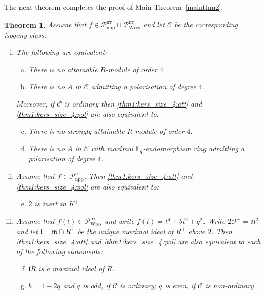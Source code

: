 \documentclass[11pt]{amsart}
\newcommand\Fq{\mathbb{F}_q}
\newcommand\cC{\mathcal{C}}
\newcommand\cO{\mathcal{O}}
\newcommand\frl{\mathfrak{l}}
\newcommand\frm{\mathfrak{m}}
\theoremstyle{plain}
\newtheorem{theorem}{Theorem}[section]
\theoremstyle{definition}
\newcommand\PirrA{\mathcal{P}^\mathrm{irr}_\mathrm{npp}}
\newcommand\PirrB{\mathcal{P}^\mathrm{irr}_\mathrm{Wres}}
\begin{document}
The next theorem completes the proof of Main Theorem~\ref{mainthm2}.
\begin{theorem}\label{thm:kers_size_4}
    Assume that $f\in\PirrA\sqcup\PirrB$ and let $\cC$ be the corresponding isogeny class.
    \begin{enumerate}[(i)]
        \item \label{thm1:kers_size_4}            
            The following are equivalent:
            \begin{enumerate}[(a)]
                \item \label{thm1:kers_size_4:att} There is no attainable $R$-module of order $4$.
                \item \label{thm1:kers_size_4:pol} There is no $A$ in $\cC$ admitting a polarisation of degree $4$.
            \end{enumerate}
            Moreover, if $\cC$ is ordinary then \ref{thm1:kers_size_4:att} and \ref{thm1:kers_size_4:pol} are also equivalent to:
            \begin{enumerate}[(a)]
                \setcounter{enumii}{2}
                \item \label{thm1:kers_size_4:str_att} There is no strongly attainable $R$-module of order $4$.
                \item \label{thm1:kers_size_4:str_pol} There is no $A$ in $\cC$ with maximal $\Fq$-endomorphism ring admitting a polarisation of degree $4$.
            \end{enumerate}
        \item \label{thm1:kers_size_4:A}
            Assume that $f\in\PirrA$.
            Then \ref{thm1:kers_size_4:att} and \ref{thm1:kers_size_4:pol} are also equivalent to:
            \begin{enumerate}[(a)]
                \setcounter{enumii}{4}
                \item \label{thm1:kers_size_4:A:inert}  $2$ is inert in $K^+$.
            \end{enumerate}
        \item \label{thm1:kers_size_4:B}
            Assume that $f(t)\in \PirrB$ and write $f(t)=t^4+bt^2+q^2$. 
            Write $2\cO^+=\frm^2$ and let $\frl=\frm\cap R^+$ be the unique maximal ideal of $R^+$ above $2$. 
            Then \ref{thm1:kers_size_4:att} and \ref{thm1:kers_size_4:pol} are also equivalent to each of the following statements:
            \begin{enumerate}[(a)]
                \setcounter{enumii}{5}
                \item \label{thm1:kers_size_4:B:max} $\frl R$ is a maximal ideal of $R$.
                \item \label{thm1:kers_size_4:B:coeff} $b=1-2q$ and $q$ is odd, if $\cC$ is ordinary; $q$ is even, if $\cC$ is non-ordinary.
            \end{enumerate}
    \end{enumerate}
\end{theorem}
\end{document}
